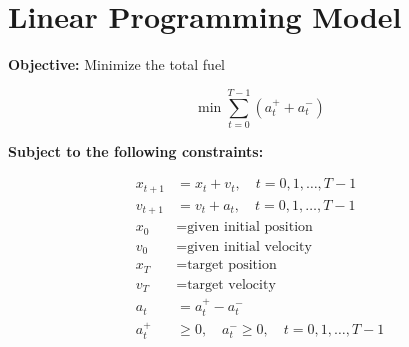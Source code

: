 \documentclass{article}
\begin{document}
\section*{Linear Programming Model}

\textbf{Objective:} Minimize the total fuel

\[
\min \sum_{t=0}^{T-1} (a^+_t + a^-_t)
\]

\textbf{Subject to the following constraints:}

\begin{align*}
x_{t+1} &= x_t + v_t, \quad t = 0, 1, \ldots, T-1 \\
v_{t+1} &= v_t + a_t, \quad t = 0, 1, \ldots, T-1 \\
x_0 &= \text{given initial position} \\
v_0 &= \text{given initial velocity} \\
x_T &= \text{target position} \\
v_T &= \text{target velocity} \\
a_t &= a^+_t - a^-_t \\
a^+_t &\geq 0, \quad a^-_t \geq 0, \quad t = 0, 1, \ldots, T-1
\end{align*}
\end{document}
